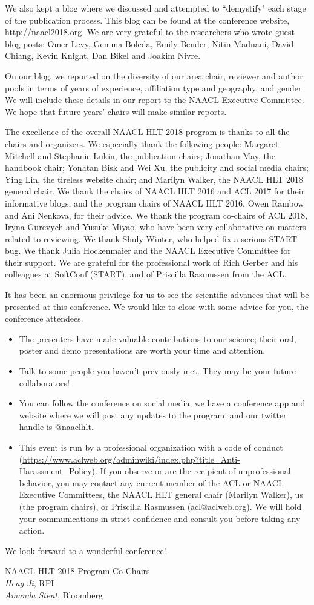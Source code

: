 We also kept a blog where we discussed and attempted to ``demystify" each stage of the publication process. This blog can be found at the conference website, {\small \url{http://naacl2018.org}}. We are very grateful to the researchers who wrote guest blog posts: Omer Levy, Gemma Boleda, Emily Bender, Nitin Madnani, David Chiang, Kevin Knight, Dan Bikel and Joakim Nivre. 

On our blog, we reported on the diversity of our area chair,  reviewer and author pools in terms of years of experience, affiliation type and geography, and gender. We will include these details in our report to the NAACL Executive Committee. We hope that future years' chairs will make similar reports.

The excellence of the overall NAACL HLT 2018 program is thanks to all the chairs and organizers. We especially thank the following people: Margaret Mitchell and Stephanie Lukin, the publication chairs; Jonathan May, the handbook chair; Yonatan Bisk and Wei Xu, the publicity and social media chairs; Ying Lin, the tireless website chair; and Marilyn Walker, the NAACL HLT 2018 general chair. We thank the chairs of NAACL HLT 2016 and ACL 2017 for their informative blogs, and the program chairs of NAACL HLT 2016, Owen Rambow and Ani Nenkova, for their advice. We thank the program co-chairs of ACL 2018, Iryna Gurevych and Yusuke Miyao, who have been very collaborative on matters related to reviewing. We thank Shuly Winter, who helped fix a serious START bug. We thank Julia Hockenmaier and the NAACL Executive Committee for their support.  We are grateful for the professional work of Rich Gerber and his colleagues at SoftConf (START), and  of Priscilla Rasmussen from the ACL. 

It has been an enormous privilege for us to see the scientific advances that will be presented at this conference. We would like to close with some advice for you, the conference attendees.  %
\begin{itemize}[noitemsep,nolistsep]
\item The presenters have made valuable contributions to our science; their oral, poster and demo presentations are worth your time and attention.
\item Talk to some people you haven't previously met. They may be your   future collaborators!
\item You can follow the conference on social media; we have a conference app and website where we will post any updates to the program, and our twitter handle is @naaclhlt. 
\item This event is run by a professional organization with a code of conduct ({\small \url{https://www.aclweb.org/adminwiki/index.php?title=Anti-Harassment_Policy}}). If you observe or are the recipient of unprofessional behavior, you may contact  any current member of the ACL or NAACL Executive Committees, the NAACL HLT general chair (Marilyn Walker), us (the program chairs), or Priscilla Rasmussen (acl@aclweb.org). We will hold your communications in strict confidence and consult you before taking any action.
\end{itemize}

We look forward to a wonderful conference! 

\vskip 0.5in
\noindent NAACL HLT 2018 Program Co-Chairs \\
{\it Heng Ji}, RPI \\
{\it Amanda Stent}, Bloomberg
